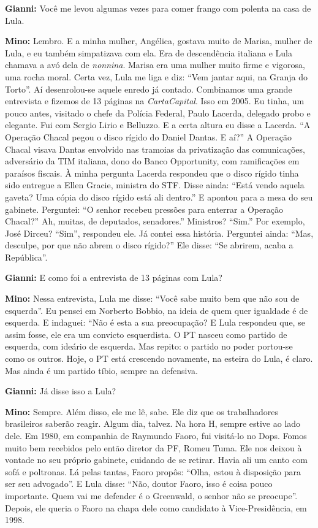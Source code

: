 \textbf{Gianni:} Você me levou algumas vezes para comer frango com
polenta na casa de Lula.

\textbf{Mino:} Lembro. E a minha mulher, Angélica, gostava muito de
Marisa, mulher de Lula, e eu também simpatizava com ela. Era de
descendência italiana e Lula chamava a avó dela de \emph{nonnina}.
Marisa era uma mulher muito firme e vigorosa, uma rocha moral. Certa
vez, Lula me liga e diz: ``Vem jantar aqui, na Granja do Torto''. Aí
desenrolou-se aquele enredo já contado. Combinamos uma grande entrevista
e fizemos de 13 páginas na \emph{CartaCapital}. Isso em 2005. Eu tinha,
um pouco antes, visitado o chefe da Polícia Federal, Paulo Lacerda,
delegado probo e elegante. Fui com Sergio Lirio e Belluzzo. E a certa
altura eu disse a Lacerda. ``A Operação Chacal pegou o disco rígido do
Daniel Dantas. E aí?'' A Operação Chacal visava Dantas envolvido nas
tramoias da privatização das comunicações, adversário da TIM italiana,
dono do Banco Opportunity, com ramificações em paraísos fiscais. À minha
pergunta Lacerda respondeu que o disco rígido tinha sido entregue a
Ellen Gracie, ministra do STF. Disse ainda: ``Está vendo aquela gaveta?
Uma cópia do disco rígido está ali dentro.'' E apontou para a mesa do
seu gabinete. Perguntei: ``O senhor recebeu pressões para enterrar a
Operação Chacal?'' Ah, muitas, de deputados, senadores.'' Ministros?
``Sim.'' Por exemplo, José Dirceu? ``Sim'', respondeu ele. Já contei
essa história. Perguntei ainda: ``Mas, desculpe, por que não abrem o
disco rígido?'' Ele disse: ``Se abrirem, acaba a República''.

\textbf{Gianni:} E como foi a entrevista de 13 páginas com Lula?

\textbf{Mino:} Nessa entrevista, Lula me disse: ``Você sabe muito bem
que não sou de esquerda''. Eu pensei em Norberto Bobbio, na ideia de
quem quer igualdade é de esquerda. E indaguei: ``Não é esta a sua
preocupação? E Lula respondeu que, se assim fosse, ele era um convicto
esquerdista. O PT nasceu como partido de esquerda, com ideário de
esquerda. Mas repito: o partido no poder portou-se como os outros. Hoje,
o PT está crescendo novamente, na esteira do Lula, é claro. Mas ainda é
um partido tíbio, sempre na defensiva.

\textbf{Gianni:} Já disse isso a Lula?

\textbf{Mino:} Sempre. Além disso, ele me lê, sabe. Ele diz que os
trabalhadores brasileiros saberão reagir. Algum dia, talvez. Na hora H,
sempre estive ao lado dele. Em 1980, em companhia de Raymundo Faoro, fui
visitá-lo no Dops. Fomos muito bem recebidos pelo então diretor da PF,
Romeu Tuma. Ele nos deixou à vontade no seu próprio gabinete, cuidando
de se retirar. Havia ali um canto com sofá e poltronas. Lá pelas tantas,
Faoro propôs: ``Olha, estou à disposição para ser seu advogado''. E Lula
disse: ``Não, doutor Faoro, isso é coisa pouco importante. Quem vai me
defender é o Greenwald, o senhor não se preocupe''. Depois, ele queria o
Faoro na chapa dele como candidato à Vice-Presidência, em 1998.

